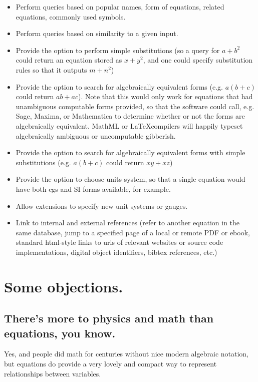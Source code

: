 \documentclass[12pt,letterpaper]{article}
\begin{document}
\begin{itemize}
\begin{enumerate}
\begin{quote}
\end{quote}
\end{enumerate}
\item Perform queries based on popular names, form of equations, related equations, commonly used symbols.
\item Perform queries based on similarity to a given input.
\item Provide the option to perform simple substitutions (so a query for $a+b^2$ could return an equation stored as $x+y^2$, and one could specify substitution rules so that it outputs $m + n^2$)
\item Provide the option to search for algebraically equivalent forms (e.g. $a(b+c)$ could return $a b + a c$). Note that this would only work for equations that had unambiguous computable forms provided, so that the software could call, e.g. Sage, Maxima, or Mathematica to determine whether or not the forms are algebraically equivalent. MathML or \LaTeX compilers will happily typeset algebraically ambiguous or uncomputable gibberish.
\item Provide the option to search for algebraically equivalent forms with simple substitutions (e.g.  $a(b+c)$ could return $ x y + x z$)
\item Provide the option to choose units system, so that a single equation would have both cgs and SI forms available, for example.
\item Allow extensions to specify new unit systems or gauges.
\item Link to internal and external references (refer to another equation in the same database, jump to a specified page of a local or remote PDF or ebook, standard html-style links to  urls of relevant websites or source code implementations, digital object identifiers, bibtex references, etc.) 
\end{itemize}

\section{Some objections.}

\label{linking}

\subsection{There's more to physics and math than equations, you know.}

Yes, and people did math for centuries without nice modern algebraic notation, but equations do provide a very lovely and compact way to represent relationships between variables.
\end{document}

